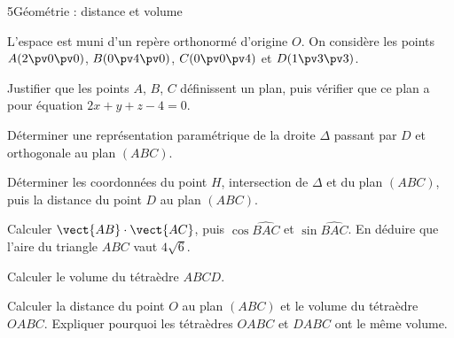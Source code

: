 \begin{exoBac}{5}{Géométrie : distance et volume}
\begin{codecote}[0.6]
L'espace est muni d'un repère orthonormé d'origine $O$. On considère les points $A(2\pv0\pv0)$, $B(0\pv4\pv0)$, $C(0\pv0\pv4)$ et
$D(1\pv3\pv3)$.
\begin{questions}
  \item Justifier que les points $A$, $B$, $C$ définissent un plan, puis vérifier que ce plan a pour équation $2x+y+z-4=0$.
  \item Déterminer une représentation paramétrique de la droite $\Delta$ passant par $D$ et orthogonale au plan $(ABC)$.
\end{questions}
\cote
\centering
{}
\end{codecote}
\begin{questions}[start=3]
  \item Déterminer les coordonnées du point $H$, intersection de $\Delta$ et du plan $(ABC)$, puis la distance du point $D$ au plan $(ABC)$.
  \item Calculer $\vect{AB}\cdot\vect{AC}$, puis $\cos\widehat{BAC}$ et $\sin\widehat{BAC}$. En déduire que l'aire du triangle $ABC$ vaut
    $4\sqrt6$.
  \item Calculer le volume du tétraèdre $ABCD$.
  \item Calculer la distance du point $O$ au plan $(ABC)$ et le volume du tétraèdre $OABC$. Expliquer pourquoi les tétraèdres $OABC$ et
    $DABC$ ont le même volume.
\end{questions}
\end{exoBac}

